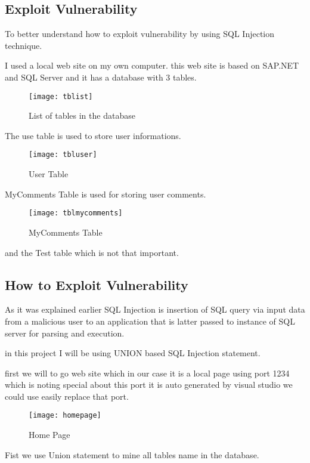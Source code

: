 \subsection{Exploit Vulnerability}
To better understand how to exploit vulnerability by using SQL Injection technique. 

I used a local web site on my own computer. this web site is based on SAP.NET and SQL Server and it has a database with 3 tables.


\begin{figure}[h!]
\texttt{[image: tblist]}
\caption{List of tables in the database }
\end{figure}

The use table is used to store user informations.

\begin{figure}[h!]
\texttt{[image: tbluser]}
\caption{User Table}
\end{figure}

MyComments Table is used for storing user comments.

\begin{figure}[h!]
\texttt{[image: tblmycomments]}
\caption{MyComments Table}
\end{figure}

and the Test table which is not that important.



\subsection{How to Exploit Vulnerability}

As it was explained earlier SQL Injection is insertion of SQL query via input data from a malicious user to an application that is latter passed to instance of SQL server for parsing and execution. 

in this project I will be using UNION based SQL Injection statement.

first we will to go web site which in our case it is a local page using port 1234 which is noting special about this port it is auto generated by visual studio we could use easily replace that port.

\begin{figure}[h!]
\texttt{[image: homepage]}
\caption{Home Page}
\end{figure}

Fist we use Union statement to mine all tables name in the database.


